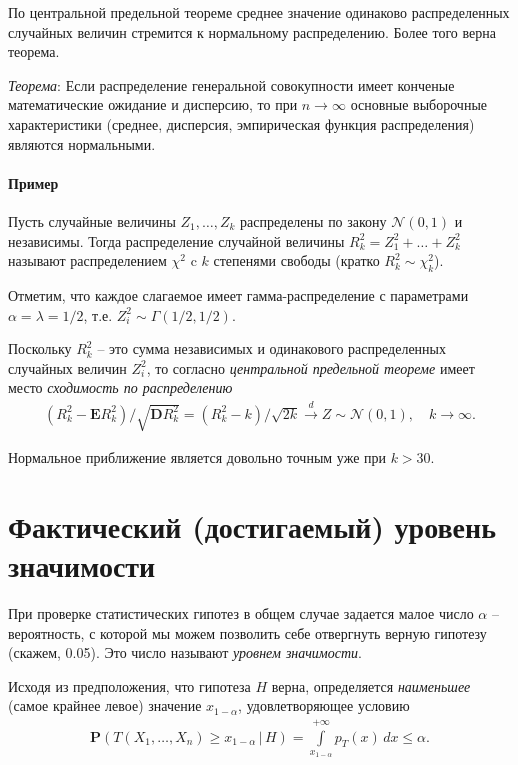 \documentclass[%
	11pt,
	a4paper,
	utf8,
		]{article}
\begin{document}
По центральной предельной теореме среднее значение одинаково распределенных случайных величин стремится к нормальному распределению. Более того верна теорема.

\emph{Теорема}: Если распределение генеральной совокупности имеет конченые математические ожидание и дисперсию, то при $ n \to \infty $ основные выборочные характеристики (среднее, дисперсия, эмпирическая функция распределения) являются нормальными.

\paragraph{Пример} Пусть случайные величины $ Z_1, \dots, Z_k $ распределены по закону $ \mathcal{N}(0, 1) $ и независимы. Тогда распределение случайной величины $ R^2_k = Z_1^2 + \dots + Z_k^2 $ называют распределением $ \chi^2 $ c $ k $ степенями свободы (кратко $ R_k^2 \sim \chi_k^2 $).

Отметим, что каждое слагаемое имеет гамма-распределение с параметрами $ \alpha = \lambda = 1/2 $, т.е. $ Z_i^2 \sim \Gamma(1/2, 1/2) $. 

Поскольку $ R_k^2 $ -- это сумма независимых и одинакового распределенных случайных величин $ Z_i^2 $, то согласно \emph{центральной предельной теореме} имеет место \emph{сходимость по распределению}
\begin{align*}
	(R_k^2 - \mathbf{E}R_k^2) / \sqrt{\mathbf{D}R_k^2} = (R_k^2 - k)/\sqrt{2 k} \xrightarrow{d} Z \sim \mathcal{N}(0, 1), \quad k \to \infty.
\end{align*}

Нормальное приближение является довольно точным уже при $ k > 30 $.


\section{Фактический (достигаемый) уровень значимости}

При проверке статистических гипотез в общем случае задается малое число $ \alpha $ -- вероятность, с которой мы можем позволить себе отвергнуть верную гипотезу (скажем, 0.05). Это число называют \emph{уровнем значимости}.

Исходя из предположения, что гипотеза $ H $ верна, определяется \emph{наименьшее} (самое крайнее левое) значение $ x_{1 - \alpha} $, удовлетворяющее условию
\begin{align*}
	\mathbf{P}(T(X_1, \dots, X_n) \geqslant x_{1 - \alpha} \,|\, H) = \int\limits_{x_{1 - \alpha}}^{+\infty} p_T(x)\,dx \leqslant \alpha.
\end{align*}
\end{document}
